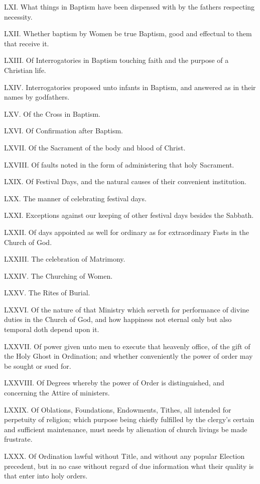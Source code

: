 LXI. What things in Baptism have been dispensed with by the fathers respecting necessity.

LXII. Whether baptism by Women be true Baptism, good and effectual to them that receive it.

LXIII. Of Interrogatories in Baptism touching faith and the purpose of a Christian life.

LXIV. Interrogatories proposed unto infants in Baptism, and answered as in their names by godfathers.

LXV. Of the Cross in Baptism.

LXVI. Of Confirmation after Baptism.

LXVII. Of the Sacrament of the body and blood of Christ.

LXVIII. Of faults noted in the form of administering that holy Sacrament.

LXIX. Of Festival Days, and the natural causes of their convenient institution.

LXX. The manner of celebrating festival days.

LXXI. Exceptions against our keeping of other festival days besides the Sabbath.

LXXII. Of days appointed as well for ordinary as for extraordinary Fasts in the Church of God.

LXXIII. The celebration of Matrimony.

LXXIV. The Churching of Women.

LXXV. The Rites of Burial.

LXXVI. Of the nature of that Ministry which serveth for performance of divine duties in the Church of God, and how happiness not eternal only but also temporal doth depend upon it.

LXXVII. Of power given unto men to execute that heavenly office, of the gift of the Holy Ghost in Ordination; and whether conveniently the power of order may be sought or sued for.  

LXXVIII. Of Degrees whereby the power of Order is distinguished, and concerning the Attire of ministers.

LXXIX. Of Oblations, Foundations, Endowments, Tithes, all intended for perpetuity of religion; which purpose being chiefly fulfilled by the clergy’s certain and sufficient maintenance, must needs by alienation of church livings be made frustrate.

LXXX. Of Ordination lawful without Title, and without any popular Election precedent, but in no case without regard of due information what their quality is that enter into holy orders.

